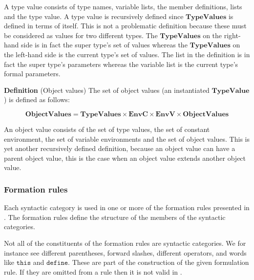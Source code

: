 A type value consists of type names, variable lists, the member definitions,
lists and the type value. A type value is recursively defined since
$\mathbf{TypeValues}$ is defined in terms of itself. This is not a problematic
definition because these must be considered as values for two different types.
The $\mathbf{TypeValues}$ on the right-hand side is in fact the super type's set
of values whereas the $\mathbf{TypeValues}$ on the left-hand side is the current
type's set of values.  The list in the definition is in fact the super type's
parameters whereas the variable list is the current type's formal parameters.

\textbf{Definition} (Object values) \hspace{0.5cm} The set of object values (an instantiated $\mathbf{TypeValue}$) is
defined as follows:

\[
  \mathbf{ObjectValues} = \mathbf{TypeValues} \times \mathbf{EnvC} \times
  \mathbf{EnvV} \times \mathbf{ObjectValues}
\]

An object value consists of the set of type values, the set of constant
environment, the set of variable environments and the set of object values. This
is yet another recursively defined definition, because an object value can have a parent object value, this is the case when an object value extends another object value. 


\subsubsection{Formation rules}
Each syntactic category is used in one or more of the formation rules
presented in . The formation rules define the structure
of the members of the syntactic categories. 

Not all of the constituents of the formation rules are syntactic categories. We
for instance see different parentheses, forward slashes, different operators, and
words like $\texttt{this}$ and $\texttt{define}$. These are part of the
construction of the given formulation rule. If they are omitted from a rule then
it is not valid in \productname{}.

